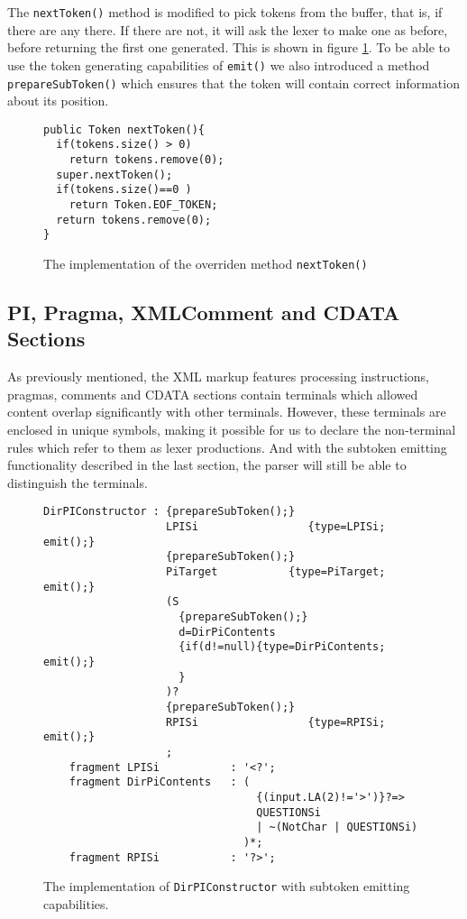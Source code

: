 The \verb!nextToken()! method is modified to pick tokens from the buffer, that is, if there are any there. If there are not, it will ask the lexer to make one as before, before returning the first one generated. This is shown in figure \ref{fig:newNextToken}. To be able to use the token generating capabilities of \verb!emit()! we also introduced a method \verb!prepareSubToken()! which ensures that the token will contain correct information about its position.

\begin{figure}[h!]
\begin{Verbatim}
public Token nextToken(){
  if(tokens.size() > 0)
    return tokens.remove(0);
  super.nextToken();
  if(tokens.size()==0 )
    return Token.EOF_TOKEN;
  return tokens.remove(0);
}
\end{Verbatim}
\caption[The overridden \texttt{nextToken()}]{The implementation of the overriden method \texttt{nextToken()}}
\label{fig:newNextToken}
\end{figure}


\subsection{PI, Pragma, XMLComment and CDATA Sections}

As previously mentioned, the XML markup features processing instructions, pragmas, comments and CDATA sections contain terminals which allowed content overlap significantly with other terminals. However, these terminals are enclosed in unique symbols, making it possible for us to declare the non-terminal rules which refer to them as lexer productions. And with the subtoken emitting functionality described in the last section, the parser will still be able to distinguish the terminals. 

\begin{figure}[h!]
\begin{Verbatim}
DirPIConstructor : {prepareSubToken();}
                   LPISi                 {type=LPISi; emit();}
                   {prepareSubToken();}
                   PiTarget           {type=PiTarget; emit();}
                   (S
                     {prepareSubToken();}
                     d=DirPiContents
                     {if(d!=null){type=DirPiContents; emit();} 
                     } 
                   )?
                   {prepareSubToken();}
                   RPISi                 {type=RPISi; emit();}
                   ;
    fragment LPISi           : '<?';
    fragment DirPiContents   : (
                                 {(input.LA(2)!='>')}?=>
                                 QUESTIONSi 
                                 | ~(NotChar | QUESTIONSi)
                               )*;
    fragment RPISi           : '?>';
\end{Verbatim}
\caption[\texttt{DirPIConstructor} emitting subtokens]{The implementation of \texttt{DirPIConstructor} with subtoken emitting capabilities.}
\label{fig:pragmaLEX}
\end{figure}

